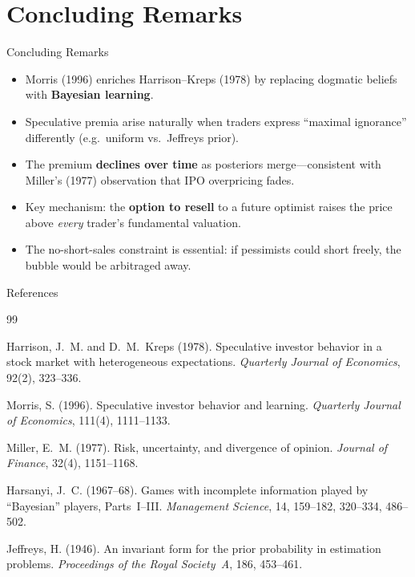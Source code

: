 \documentclass[11pt,aspectratio=169]{beamer}
\begin{document}
\section{Concluding Remarks}

\begin{frame}{Concluding Remarks}

\begin{itemize}
\item Morris (1996) enriches   Harrison--Kreps (1978) by replacing
      dogmatic beliefs with \textbf{Bayesian learning}.

\item Speculative premia arise naturally when traders express
      ``maximal ignorance'' differently
      (e.g.\ uniform vs.\ Jeffreys prior).

\item The premium \textbf{declines over time} as posteriors
      merge---consistent with Miller's (1977) observation that IPO
      overpricing fades.

\item Key mechanism: the \textbf{option to resell} to a future
      optimist raises the price above \emph{every} trader's
      fundamental valuation.

\item The no-short-sales constraint is essential: if pessimists
      could short freely, the bubble would be arbitraged away.
\end{itemize}

\end{frame}

\begin{frame}{References}

\begin{thebibliography}{99}

Harrison, J.~M. and D.~M.~Kreps (1978).
\newblock Speculative investor behavior in a stock market with
heterogeneous expectations.
\newblock \emph{Quarterly Journal of Economics}, 92(2), 323--336.

Morris, S. (1996).
\newblock Speculative investor behavior and learning.
\newblock \emph{Quarterly Journal of Economics}, 111(4), 1111--1133.

Miller, E.~M. (1977).
\newblock Risk, uncertainty, and divergence of opinion.
\newblock \emph{Journal of Finance}, 32(4), 1151--1168.

Harsanyi, J.~C. (1967--68).
\newblock Games with incomplete information played by ``Bayesian''
players, Parts~I--III.
\newblock \emph{Management Science}, 14, 159--182, 320--334, 486--502.

Jeffreys, H. (1946).
\newblock An invariant form for the prior probability in estimation
problems.
\newblock \emph{Proceedings of the Royal Society~A}, 186, 453--461.

\end{thebibliography}

\end{frame}
\end{document}
